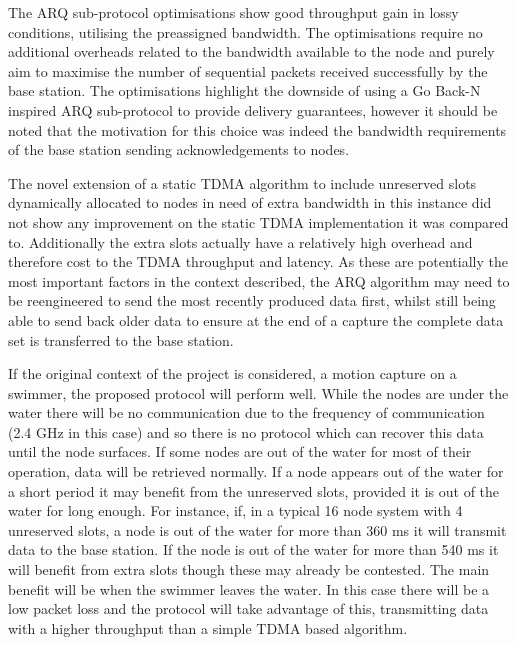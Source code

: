 \documentclass[parskip]{cs4rep}
\begin{document}
The ARQ sub-protocol optimisations show good throughput gain in lossy conditions, utilising the preassigned bandwidth. The optimisations require no additional overheads related to the bandwidth available to the node and purely aim to maximise the number of sequential packets received successfully by the base station. The optimisations highlight the downside of using a Go Back-N inspired ARQ sub-protocol to provide delivery guarantees, however it should be noted that the motivation for this choice was indeed the bandwidth requirements of the base station sending acknowledgements to nodes.

The novel extension of a static TDMA algorithm to include unreserved slots dynamically allocated to nodes in need of extra bandwidth in this instance did not show any improvement on the static TDMA implementation it was compared to. Additionally the extra slots actually have a relatively high overhead and therefore cost to the TDMA throughput and latency. As these are potentially the most important factors in the context described, the ARQ algorithm may need to be reengineered to send the most recently produced data first, whilst still being able to send back older data to ensure at the end of a capture the complete data set is transferred to the base station. 

If the original context of the project is considered, a motion capture on a swimmer, the proposed protocol will perform well. While the nodes are under the water there will be no communication due to the frequency of communication (2.4 GHz in this case) and so there is no protocol which can recover this data until the node surfaces. If some nodes are out of the water for most of their operation, data will be retrieved normally. If a node appears out of the water for a short period it may benefit from the unreserved slots, provided it is out of the water for long enough. For instance, if, in a typical 16 node system with 4 unreserved slots, a node is out of the water for more than 360 ms it will transmit data to the base station. If the node is out of the water for more than 540 ms it will benefit from extra slots though these may already be contested. The main benefit will be when the swimmer leaves the water. In this case there will be a low packet loss and the protocol will take advantage of this, transmitting data with a higher throughput than a simple TDMA based algorithm.
\end{document}

